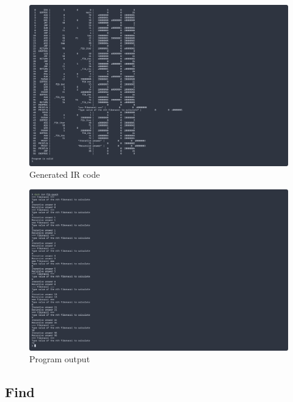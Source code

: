 \begin{figure}[H]
    \centering
    \caption{Generated IR code}
    \includegraphics[width=\textwidth]{evidences/fib_ir}
\end{figure}

\begin{figure}[H]
    \centering
    \caption{Program output}
    \includegraphics[width=\textwidth]{evidences/fib_output}
\end{figure}

\newpage

\subsection{Find}

